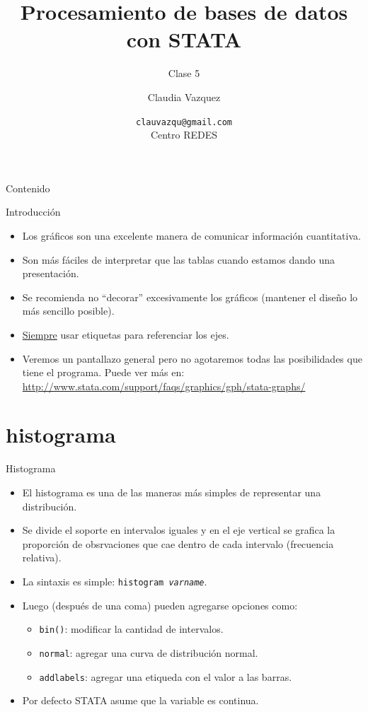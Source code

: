 \documentclass{beamer}
\title[Clase 5]{Procesamiento de bases de datos con STATA}
\subtitle{Clase 5}
\author{Claudia Vazquez}
\date[]{\texttt{clauvazqu@gmail.com}\\Centro REDES}
\begin{document}
\begin{frame}
  \titlepage
\end{frame}

\begin{frame}{Contenido}
  \tableofcontents
 \end{frame}

\begin{frame}{Introducción}
\begin{itemize}
\item Los gráficos son una excelente manera de comunicar información cuantitativa.
\item Son más fáciles de interpretar que las tablas cuando estamos dando una presentación.
\item Se recomienda no ``decorar'' excesivamente los gráficos (mantener el diseño lo más sencillo posible). 
\item \underline{Siempre} usar etiquetas para referenciar los ejes.
\item Veremos un pantallazo general pero no agotaremos todas las posibilidades que tiene el programa. Puede ver más en:  \url{http://www.stata.com/support/faqs/graphics/gph/stata-graphs/}
\end{itemize}
\end{frame}
\section{histograma}

\begin{frame}{Histograma}
\begin{itemize}
\item El histograma es una de las maneras más simples de representar una distribución. 
\item Se divide el soporte en intervalos iguales y en el eje vertical se grafica la proporción de obsrvaciones que cae dentro de cada intervalo (frecuencia relativa).
\item La sintaxis es simple: \texttt{histogram \textit{varname}}. 
\item Luego (después de una coma) pueden agregarse opciones como:
\begin{itemize}
\item \texttt{bin()}: modificar la cantidad de intervalos.
\item \texttt{normal}: agregar una curva de distribución normal.
\item \texttt{addlabels}: agregar una etiqueda con el valor a las barras.
\end{itemize}
\item Por defecto STATA asume que la variable es continua.
\end{itemize}
\end{frame}
\end{document}
